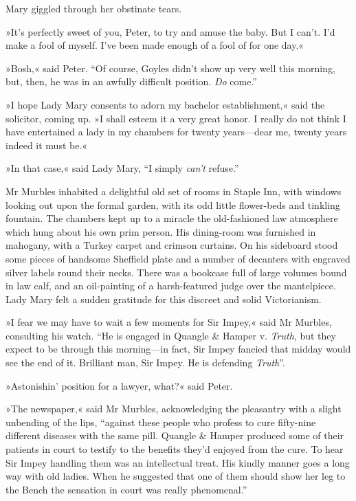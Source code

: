 Mary giggled through her obstinate tears.

»It's perfectly sweet of you, Peter, to try and amuse the baby. But I can't. I'd make a fool of myself. I've been made enough of a fool of for one day.«

»Bosh,« said Peter. \enquote{Of course, Goyles didn't show up very well this morning, but, then, he was in an awfully difficult position. \textit{Do} come.}

»I hope Lady Mary consents to adorn my bachelor establishment,« said the solicitor, coming up. »I shall esteem it a very great honor. I really do not think I have entertained a lady in my chambers for twenty years\allowbreak---\allowbreak dear me, twenty years indeed it must be.«

»In that case,« said Lady Mary, \enquote{I simply \textit{can't} refuse.}

Mr Murbles inhabited a delightful old set of rooms in Staple Inn, with windows looking out upon the formal garden, with its odd little flower-beds and tinkling fountain. The chambers kept up to a miracle the old-fashioned law atmosphere which hung about his own prim person.  His dining-room was furnished in mahogany, with a Turkey carpet and crimson curtains. On his sideboard stood some pieces of handsome Sheffield plate and a number of decanters with engraved silver labels round their necks. There was a bookcase full of large volumes bound in law calf, and an oil-painting of a harsh-featured judge over the mantelpiece. Lady Mary felt a sudden gratitude for this discreet and solid Victorianism.

»I fear we may have to wait a few moments for Sir Impey,« said Mr  Murbles, consulting his watch. \enquote{He is engaged in Quangle \& Hamper v.  \textit{Truth}, but they expect to be through this morning\allowbreak---\allowbreak in fact, Sir Impey fancied that midday would see the end of it. Brilliant man, Sir Impey.  He is defending \textit{Truth}}.

»Astonishin' position for a lawyer, what?« said Peter.

»The newspaper,« said Mr Murbles, acknowledging the pleasantry with a slight unbending of the lips, \enquote{against these people who profess to cure fifty-nine different diseases with the same pill. Quangle \& Hamper produced some of their patients in court to testify to the benefits they'd enjoyed from the cure. To hear Sir Impey handling them was an intellectual treat. His kindly manner goes a long way with old ladies.  When he suggested that one of them should show her leg to the Bench the sensation in court was really phenomenal.}

